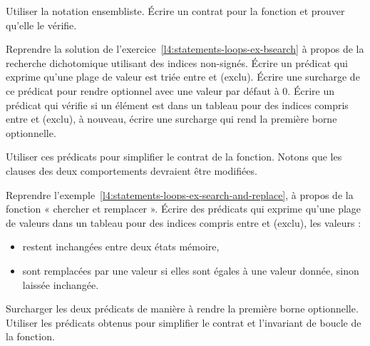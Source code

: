 Utiliser la notation ensembliste. Écrire un contrat pour la fonction et prouver
qu'elle le vérifie.



\label{l4:acsl-properties-predicates-ex-bsearch}


Reprendre la solution de l'exercice~\ref{l4:statements-loops-ex-bsearch} à propos
de la recherche dichotomique utilisant des indices non-signés. Écrire un prédicat
qui exprime qu'une plage de valeur est triée entre  et
 (exclu). Écrire une surcharge de ce prédicat pour rendre
 optionnel avec une valeur par défaut à $0$. Écrire un prédicat
qui vérifie si un élément est dans un tableau pour des indices compris entre
 et  (exclu), à nouveau, écrire une surcharge
qui rend la première borne optionnelle.


Utiliser ces prédicats pour simplifier le contrat de la fonction. Notons que les
clauses  des deux comportements devraient être modifiées.





Reprendre l'exemple~\ref{l4:statements-loops-ex-search-and-replace}, à propos de
la fonction « chercher et remplacer ». Écrire des prédicats qui exprime qu'une plage
de valeurs dans un tableau pour des indices compris entre  et
 (exclu), les valeurs :

\begin{itemize}
  \item restent inchangées entre deux états mémoire,
  \item sont remplacées par une valeur si elles sont égales à une valeur donnée,
        sinon laissée inchangée.
\end{itemize}


Surcharger les deux prédicats de manière à rendre la première borne optionnelle.
Utiliser les prédicats obtenus pour simplifier le contrat et l'invariant de
boucle de la fonction.
